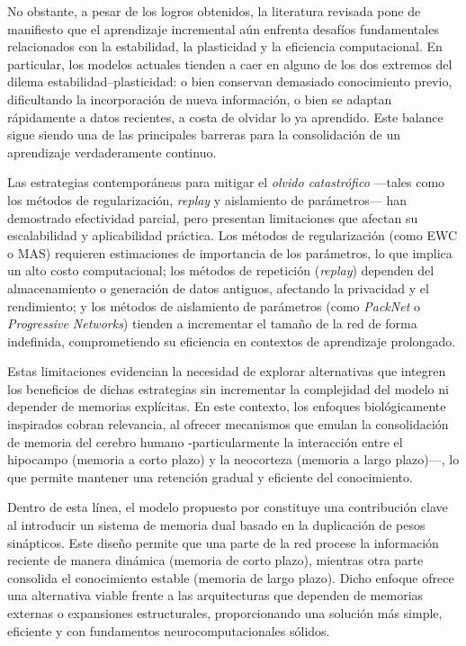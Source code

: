 \documentclass[10pt,a4paper]{article}
\begin{document}
No obstante, a pesar de los logros obtenidos, la literatura revisada pone de manifiesto que el aprendizaje incremental aún enfrenta desafíos fundamentales relacionados con la estabilidad, la plasticidad y la eficiencia computacional. 
En particular, los modelos actuales tienden a caer en alguno de los dos extremos del dilema estabilidad–plasticidad: o bien conservan demasiado conocimiento previo, dificultando la incorporación de nueva información, o bien se adaptan rápidamente a datos recientes, a costa de olvidar lo ya aprendido. 
Este balance sigue siendo una de las principales barreras para la consolidación de un aprendizaje verdaderamente continuo.

Las estrategias contemporáneas para mitigar el \textit{olvido catastrófico} —tales como los métodos de regularización, \textit{replay} y aislamiento de parámetros— han demostrado efectividad parcial, pero presentan limitaciones que afectan su escalabilidad y aplicabilidad práctica. 
Los métodos de regularización (como EWC o MAS) requieren estimaciones de importancia de los parámetros, lo que implica un alto costo computacional; los métodos de repetición (\textit{replay}) dependen del almacenamiento o generación de datos antiguos, afectando la privacidad y el rendimiento; y los métodos de aislamiento de parámetros (como \textit{PackNet} o \textit{Progressive Networks}) tienden a incrementar el tamaño de la red de forma indefinida, comprometiendo su eficiencia en contextos de aprendizaje prolongado. 

Estas limitaciones evidencian la necesidad de explorar alternativas que integren los beneficios de dichas estrategias sin incrementar la complejidad del modelo ni depender de memorias explícitas. 
En este contexto, los enfoques biológicamente inspirados cobran relevancia, al ofrecer mecanismos que emulan la consolidación de memoria del cerebro humano -particularmente la interacción entre el hipocampo (memoria a corto plazo) y la neocorteza (memoria a largo plazo)—, lo que permite mantener una retención gradual y eficiente del conocimiento.  

Dentro de esta línea, el modelo propuesto por \cite{bullinaria2009} constituye una contribución clave al introducir un sistema de memoria dual basado en la duplicación de pesos sinápticos. 
Este diseño permite que una parte de la red procese la información reciente de manera dinámica (memoria de corto plazo), mientras otra parte consolida el conocimiento estable (memoria de largo plazo). 
Dicho enfoque ofrece una alternativa viable frente a las arquitecturas que dependen de memorias externas o expansiones estructurales, proporcionando una solución más simple, eficiente y con fundamentos neurocomputacionales sólidos.
\end{document}
